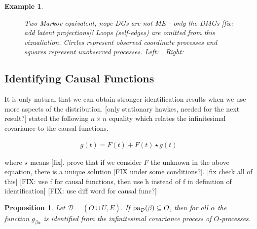 \documentclass[accepted]{uai2021} %
\newtheorem{exmp}[thm]{Example}
\newtheorem{prop}[thm]{Proposition}
\newcommand{\pa}{\textnormal{pa}}
\newcommand{\disjU}{\mathbin{\dot{\cup}}}
\begin{document}
\begin{exmp}
\begin{figure*}
\begin{subfigure}{0.48\linewidth}
			\end{subfigure}
			\caption{\label{fig:cyclicDGs} Two Markov equivalent, nope DGs are 
			not ME - only the DMGs [fix: add latent projections]! Loops 
			(self-edges) are omitted from 
			this 
				vizualiation. Circles represent observed coordinate processes 
				and 
				squares represent unobserved processes. Left: . Right: }
		\end{figure*}
\end{exmp}



\subsection{Identifying Causal Functions}

It is only natural that we can obtain stronger identification results when we 
use more aspects of the distribution. [only stationary hawkes, needed for the 
next result?] \cite{hawkesJRSSB1971} stated the following $n\times n$ equality 
which 
relates the infinitesimal covariance to the causal functions.

\begin{align}
	g(t) = F(t) + F(t) \star g(t)
	\label{eq:covCauFunc}
\end{align}

where $\star$ means [fix]. \cite{bacry2016} prove that if we consider $F$ the 
unknown in the above equation, there is a unique solution [FIX under some 
conditions?]. [fix check all of 
this] [FIX: use f for causal functions, then use h instead of f in definition 
of identification] [FIX: use diff word for causal func?]

\begin{prop}
	Let $\mathcal{D} = (O\disjU U, E)$. If $\pa_\mathcal{D}(\beta) \subseteq 
	O$, then for all $\alpha$ the function $g_{\beta\alpha}$ is identified from 
	the infinitesimal covariance process of $O$-processes.
	\label{prop:gPaId}
\end{prop}
\end{document}
